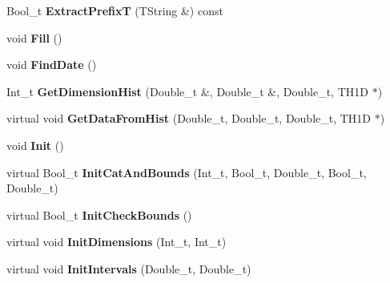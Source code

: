 \begin{DoxyCompactItemize}
\item 
\hypertarget{classTSplineFit_ab98f8db9598a8836d12f52d3aa239d29}{
Bool\_\-t {\bfseries ExtractPrefixT} (TString \&) const }
\label{classTSplineFit_ab98f8db9598a8836d12f52d3aa239d29}

\item 
\hypertarget{classTSplineFit_a1d26dd47cf5a5579d25f85eef97d887c}{
void {\bfseries Fill} ()}
\label{classTSplineFit_a1d26dd47cf5a5579d25f85eef97d887c}

\item 
\hypertarget{classTSplineFit_a93710001f7a21650284d359f9c517b7d}{
void {\bfseries FindDate} ()}
\label{classTSplineFit_a93710001f7a21650284d359f9c517b7d}

\item 
\hypertarget{classTSplineFit_a43cfe894d82a8765ca1aae65bc1057d8}{
Int\_\-t {\bfseries GetDimensionHist} (Double\_\-t \&, Double\_\-t \&, Double\_\-t, TH1D $\ast$)}
\label{classTSplineFit_a43cfe894d82a8765ca1aae65bc1057d8}

\item 
\hypertarget{classTSplineFit_a6f1ea5503e61b7c5219ceaf0ce869469}{
virtual void {\bfseries GetDataFromHist} (Double\_\-t, Double\_\-t, Double\_\-t, TH1D $\ast$)}
\label{classTSplineFit_a6f1ea5503e61b7c5219ceaf0ce869469}

\item 
\hypertarget{classTSplineFit_ad184ed1b147d7ac8ba4d0f837636c6a8}{
void {\bfseries Init} ()}
\label{classTSplineFit_ad184ed1b147d7ac8ba4d0f837636c6a8}

\item 
\hypertarget{classTSplineFit_a07376883cd96d9a26f14204f31ccb6b6}{
virtual Bool\_\-t {\bfseries InitCatAndBounds} (Int\_\-t, Bool\_\-t, Double\_\-t, Bool\_\-t, Double\_\-t)}
\label{classTSplineFit_a07376883cd96d9a26f14204f31ccb6b6}

\item 
\hypertarget{classTSplineFit_a89067f9c9aa9d7b3d517fc0780cde71b}{
virtual Bool\_\-t {\bfseries InitCheckBounds} ()}
\label{classTSplineFit_a89067f9c9aa9d7b3d517fc0780cde71b}

\item 
\hypertarget{classTSplineFit_a8c80e0f2def278c597a8e7c2f1cbe131}{
virtual void {\bfseries InitDimensions} (Int\_\-t, Int\_\-t)}
\label{classTSplineFit_a8c80e0f2def278c597a8e7c2f1cbe131}

\item 
\hypertarget{classTSplineFit_aa66cdcfa83c68cb33a30522d42ed9d37}{
virtual void {\bfseries InitIntervals} (Double\_\-t, Double\_\-t)}
\label{classTSplineFit_aa66cdcfa83c68cb33a30522d42ed9d37}


\end{DoxyCompactItemize}

